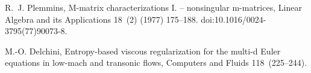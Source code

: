 \documentclass[xchauthor,chkrefs,fixeqskip,GCNS,amsmath,amsthm]{yjcphg}
\theoremstyle{remark}
\begin{document}
\begin{backmatter}
\begin{thebibliography}{}
\begin{bsubitem}
\begin{bcontribution}%
\end{bcontribution}
\begin{bhost}
\begin{bissue}
\end{bissue}
\end{bhost}
\end{bsubitem}
%
\OrigBibText
R.~J. Plemmins, M-matrix characterizations I. -- nonsingular
m-matrices, Linear Algebra and its Applications 18~(2) (1977) 175--188.
\newblock doi:10.1016/0024-3795(77)90073-8.
\endOrigBibText
{}%
\endbibitem

\begin{bsubitem}
\begin{bcontribution}%
\end{bcontribution}
\begin{bhost}
\begin{bissue}
\end{bissue}
\end{bhost}
\end{bsubitem}
%
\OrigBibText
M.-O. Delchini, Entropy-based viscous regularization for the multi-d
{E}uler equations in low-mach and transonic flows, Computers and Fluids
118~(225--244).
\endOrigBibText
{}%
\endbibitem


\end{thebibliography}
\end{backmatter}
\end{document}
